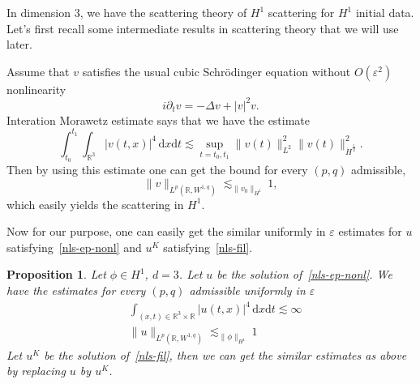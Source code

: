 \documentclass[10pt,a4paper]{article}
\newtheorem{proposition}[theorem]{Proposition}
\begin{document}
  In dimension \(3\), we have the scattering theory of \(H^1\) scattering for
  \(H^1\) initial data. Let's first recall some intermediate results in
  scattering theory that we will use later. 
  
  Assume that \(v\) satisfies the usual cubic Schr\"odinger equation without 
  \(O(\varepsilon^2)\) nonlinearity
  \begin{equation}\label{nls}
    i\partial_t v = -\Delta v + |v|^2 v.
  \end{equation}
  Interation Morawetz estimate says that we have the estimate 
  \[ \int_{t_0}^{t_1}\int_{\mathbb R^3} |v(t,x)|^4\,\mathrm{d}x\mathrm{d}t
  \lesssim \sup_{t=t_0,t_1} \|v(t)\|^2_{L^2}\|v(t)\|^2_{\dot{H}^\frac12}.\]
  Then by using this estimate one can get the bound for every \((p,q)\)
  admissible,
  \[ \|v\|_{L^p(\mathbb R,W^{1,q})} \lesssim_{\|v_0\|_{H^1}} 1,\]
  which easily yields the scattering in \(H^1\).

  Now for our purpose, one can easily get the similar uniformly in
  \(\varepsilon\) estimates for \(u\) satisfying~\eqref{nls-ep-nonl} and
  \(u^K\) satisfying~\eqref{nls-fil}. 
  \begin{proposition}\label{S1}
    Let \(\phi \in H^1\), \( d = 3 \). Let \( u \) be the solution 
    of~\eqref{nls-ep-nonl}. We have the estimates for every \((p,q)\) admissible 
    uniformly in \(\varepsilon\)
    \begin{equation}
      \begin{aligned}
        & \int_{(x,t)\in\mathbb R^3\times\mathbb R} |u(t,x)|^4\,\mathrm{d}x\mathrm{d}t
        \lesssim \infty \\ 
        & \|u\|_{L^p(\mathbb R,W^{1,q})} \lesssim_{\|\phi\|_{H^1}} 1
      \end{aligned}
    \end{equation}
    Let \(u^K\) be the solution of~\eqref{nls-fil}, then we can get the similar
    estimates as above by replacing \(u\) by \(u^K\).
  \end{proposition}
\end{document}
